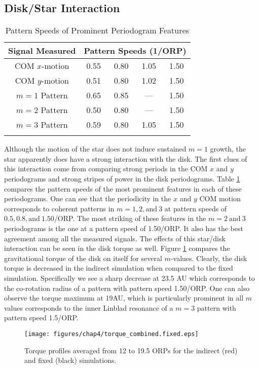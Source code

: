 \subsection{Disk/Star Interaction} \label{SMdiskstar}
\begin{table}[b]
\centering
\caption[Pattern Speeds of Periodogram Features]{Pattern Speeds of Prominent Periodogram Features}
\begin{tabular}{ccccc}
\hline
Signal Measured&\multicolumn{4}{c}{Pattern Speeds (1/ORP)}\\
\hline\hline
COM $x$-motion&0.55&0.80&1.05&1.50\\
COM $y$-motion&0.51&0.80&1.02&1.50\\
$m = 1$ Pattern&0.65&0.85&---&1.50\\
$m = 2$ Pattern&0.50&0.80&---&1.50\\
$m = 3$ Pattern&0.59&0.80&1.05&1.50\\
\hline
\label{SMperiodtable}
\end{tabular}
\end{table}
Although the motion of the star does not induce sustained $m = 1$ growth, the star apparently does have a strong interaction with the disk. The first clues of this interaction come from comparing strong periods in the COM $x$ and $y$ periodograms and strong stripes of power in the disk periodograms. Table \ref{SMperiodtable} compares the pattern speeds of the most prominent features in each of these periodograms. One can see that the periodicity in the $x$ and $y$ COM motion corresponds to coherent patterns in $m = 1, 2, \mathrm{and}~ 3$ at pattern speeds of $0.5, 0.8, \mathrm{and }~ 1.50$/ORP. The most striking of these features in the $m = 2 ~\mathrm{ and }~ 3$ periodograms is the one at a pattern speed of 1.50/ORP. It also has the best agreement among all the measured signals. The effects of this star/disk interaction can be seen in the disk torque as well. Figure \ref{SMdisktorque} compares the gravitational torque of the disk on itself for several $m$-values. Clearly, the disk torque is decreased in the indirect simulation when compared to the fixed simulation. Specifically we see a sharp decrease at 23.5 AU which corresponds to the co-rotation radius of a pattern with pattern speed 1.50/ORP. One can also observe the torque maximum at 19AU, which is particularly prominent in all $m$ values corresponds to the inner Linblad resonance of a $m = 3$ pattern with pattern speed 1.5/ORP.  
\begin{figure}[p]
\centering
\texttt{[image: figures/chap4/torque\_combined.fixed.eps]}
\caption[Comparison of indirect and fixed run asymptotic torque profiles.]{Torque profiles averaged from 12 to 19.5 ORPs for the indirect (red) and fixed (black) simulations.}
\label{SMdisktorque}
\end{figure}

